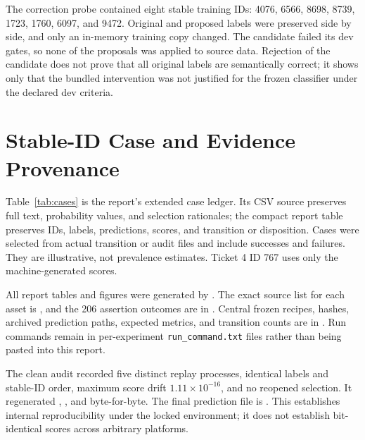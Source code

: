 \documentclass[conference]{IEEEtran}
\begin{document}
The correction probe contained eight stable training IDs: 4076, 6566, 8698, 8739, 1723, 1760, 6097, and 9472. Original and proposed labels were preserved side by side, and only an in-memory training copy changed. The candidate failed its dev gates, so none of the proposals was applied to source data. Rejection of the candidate does not prove that all original labels are semantically correct; it shows only that the bundled intervention was not justified for the frozen classifier under the declared dev criteria.

\section{Stable-ID Case and Evidence Provenance}

\balance

Table~\ref{tab:cases} is the report's extended case ledger. Its CSV source preserves full text, probability values, and selection rationales; the compact report table preserves IDs, labels, predictions, scores, and transition or disposition. Cases were selected from actual transition or audit files and include successes and failures. They are illustrative, not prevalence estimates. Ticket 4 ID 767 uses only the machine-generated scores.

All report tables and figures were generated by . The exact source list for each asset is , and the 206 assertion outcomes are in . Central frozen recipes, hashes, archived prediction paths, expected metrics, and transition counts are in . Run commands remain in per-experiment \texttt{run\_command.txt} files rather than being pasted into this report.

The clean audit recorded five distinct replay processes, identical labels and stable-ID order, maximum score drift $1.11\times10^{-16}$, and no reopened selection. It regenerated , , and  byte-for-byte. The final prediction file is . This establishes internal reproducibility under the locked environment; it does not establish bit-identical scores across arbitrary platforms.
\end{document}
